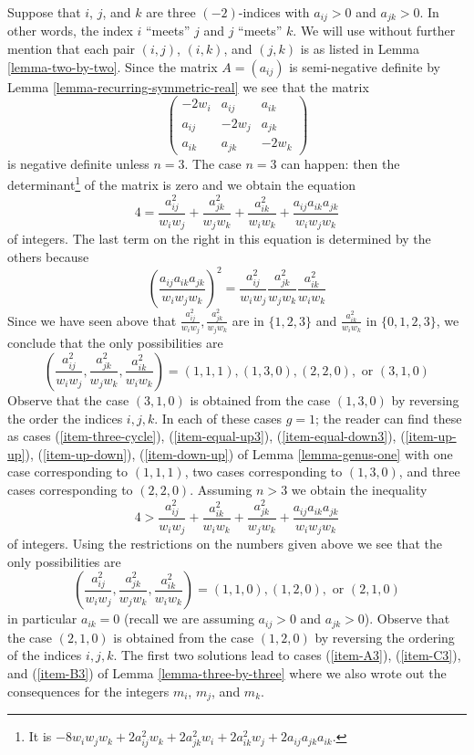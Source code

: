 \noindent
Suppose that $i$, $j$, and $k$ are three $(-2)$-indices with $a_{ij} > 0$
and $a_{jk} > 0$.  In other words, the index $i$ ``meets'' $j$ and
$j$ ``meets'' $k$. We will use without further mention that each pair
$(i, j)$, $(i, k)$, and $(j, k)$ is as listed in Lemma \ref{lemma-two-by-two}.
Since the matrix $A = (a_{ij})$ is semi-negative
definite by Lemma \ref{lemma-recurring-symmetric-real} we see that the matrix
$$
\left(
\begin{matrix}
-2w_i & a_{ij} & a_{ik} \\
a_{ij} & -2w_j & a_{jk} \\
a_{ik} & a_{jk} & -2w_k
\end{matrix}
\right)
$$
is negative definite unless $n = 3$. The case $n = 3$ can happen:
then the determinant\footnote{It is
$-8w_iw_jw_k + 2a_{ij}^2w_k + 2a_{jk}^2w_i + 2a_{ik}^2w_j +
2a_{ij}a_{jk}a_{ik}$.} of the matrix is zero
and we obtain the equation
$$
4 = \frac{a_{ij}^2}{w_iw_j} +
\frac{a_{jk}^2}{w_jw_k} +
\frac{a_{ik}^2}{w_iw_k} +
\frac{a_{ij}a_{ik}a_{jk}}{w_iw_jw_k}
$$
of integers. The last term on the right in this equation is determined
by the others because
$$
\left(\frac{a_{ij}a_{ik}a_{jk}}{w_iw_jw_k}\right)^2 =
\frac{a_{ij}^2}{w_iw_j} \frac{a_{jk}^2}{w_jw_k} \frac{a_{ik}^2}{w_iw_k}
$$
Since we have seen above that
$\frac{a_{ij}^2}{w_iw_j}, \frac{a_{jk}^2}{w_jw_k}$ are in
$\{1, 2, 3\}$ and $\frac{a_{ik}^2}{w_iw_k}$ in $\{0, 1, 2, 3\}$,
we conclude that the only possibilities are
$$
(\frac{a_{ij}^2}{w_iw_j}, \frac{a_{jk}^2}{w_jw_k}, \frac{a_{ik}^2}{w_iw_k}) =
(1, 1, 1), (1, 3, 0), (2, 2, 0),\text{ or } (3, 1, 0)
$$
Observe that the case $(3, 1, 0)$ is obtained from the case $(1, 3, 0)$
by reversing the order the indices $i, j, k$.
In each of these cases $g = 1$; the reader can find these as cases
(\ref{item-three-cycle}), (\ref{item-equal-up3}), (\ref{item-equal-down3}),
(\ref{item-up-up}), (\ref{item-up-down}), (\ref{item-down-up}) of
Lemma \ref{lemma-genus-one}
with one case corresponding to $(1, 1, 1)$,
two cases corresponding to $(1, 3, 0)$, and
three cases corresponding to $(2, 2, 0)$.
Assuming $n > 3$
we obtain the inequality
$$
4 > \frac{a_{ij}^2}{w_iw_j} + \frac{a_{ik}^2}{w_iw_k} +
\frac{a_{jk}^2}{w_jw_k} + \frac{a_{ij}a_{ik}a_{jk}}{w_iw_jw_k}
$$
of integers. Using the restrictions on the numbers given above
we see that the only possibilities are
$$
(\frac{a_{ij}^2}{w_iw_j}, \frac{a_{jk}^2}{w_jw_k}, \frac{a_{ik}^2}{w_iw_k}) =
(1, 1, 0), (1, 2, 0),\text{ or }(2, 1, 0)
$$
in particular $a_{ik} = 0$ (recall we are assuming
$a_{ij} > 0$ and $a_{jk} > 0$). Observe that the case
$(2, 1, 0)$ is obtained from the case $(1, 2, 0)$ by reversing
the ordering of the indices $i, j, k$. The first two solutions lead
to cases (\ref{item-A3}), (\ref{item-C3}), and (\ref{item-B3})
of Lemma \ref{lemma-three-by-three} where we also wrote out the consequences
for the integers $m_i$, $m_j$, and $m_k$.

